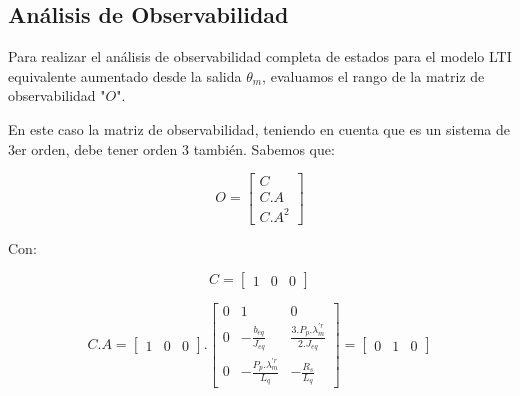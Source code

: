 \documentclass{article}
\begin{document}

\subsection{Análisis de Observabilidad}

Para realizar el análisis de observabilidad completa de estados para el modelo LTI equivalente 
aumentado desde la salida $\theta_m$, evaluamos el rango de la matriz de observabilidad "$O$".

En este caso la matriz de observabilidad, teniendo en cuenta que es un sistema de 3er orden, 
debe tener orden 3 también. Sabemos que:

\begin{equation}
    O = \begin{bmatrix}
        C \\
        C.A \\
        C.A^2
    \end{bmatrix}
\end{equation}

Con:

\begin{equation}
    C = \begin{bmatrix}
        1 & 0 & 0
    \end{bmatrix}
\end{equation}

\begin{equation}
    C.A = 
    \begin{bmatrix}
        1 & 0 & 0
    \end{bmatrix}.
    \begin{bmatrix}
        0 & 1 & 0 \\
        0 & -\frac{b_{eq}}{J_{eq}} & \frac{3.P_p.\lambda_m^{\prime r}}{2.J_{eq}} \\
        0 & -\frac{P_p.\lambda_m^{\prime r}}{L_q} & -\frac{R_s}{L_q}
    \end{bmatrix}
    =
    \begin{bmatrix}
        0 & 1 & 0
    \end{bmatrix}
\end{equation}
\end{document}
